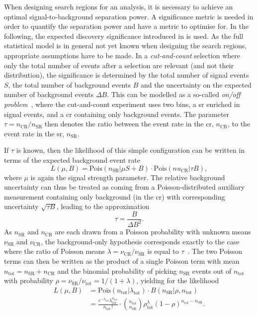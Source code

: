 When designing search regions for an analysis, it is necessary to achieve an optimal signal-to-background separation power. A significance metric is needed in order to quantify the separation power and have a metric to optimise for. In the following, the expected discovery significance introduced in \cite{Cousins:2007bmb} is used. As the full statistical model is in general not yet known when designing the search regions, appropriate assumptions have to be made. In a \textit{cut-and-count} selection where only the total number of events after a selection are relevant (and not \eg their distribution), the significance is determined by the total number of signal events $S$, the total number of background events $B$ and the uncertainty on the expected number of background events $\Delta B$. This can be modelled as a so-called \textit{on/off problem}~\cite{Cousins:2007bmb, CRANMER_2006}, where the cut-and-count experiment uses two bins, a \gls{sr} enriched in signal events, and a \gls{cr} containing only background events. The parameter $\tau = n_\mathrm{CR} / n_\mathrm{SR}$ then denotes the ratio between the event rate in the \gls{cr}, $n_\mathrm{CR}$, to the event rate in the \gls{sr}, $n_\mathrm{SR}$.

If $\tau$ is known, then the likelihood of this simple configuration can be written in terms of the expected background event rate
\begin{equation}
	L (\mu,B) = \mathrm{Pois}(n_{\mathrm{SR}}\vert\mu S + B) \cdot \mathrm{Pois}(nu_{\mathrm{CR}}\vert\tau B),
\end{equation} 
where $\mu$ is again the signal strength parameter. The relative background uncertainty can thus be treated as coming from a Poisson-distributed auxiliary measurement containing only background (\ie in the \gls{cr}) with corresponding uncertainty $\sqrt{\tau B}$, leading to the approximation
\begin{equation}
	\tau = \frac{B}{\Delta B^2}.
\end{equation}
As $n_{\mathrm{SR}}$ and $n_{\mathrm{CR}}$ are each drawn from a Poisson probability with unknown means $\nu_\mathrm{SR}$ and $\nu_\mathrm{CR}$, the background-only hypothesis corresponds exactly to the case where the ratio of Poisson means $\lambda = \nu_\mathrm{CR} / \nu_\mathrm{SR}$ is equal to $\tau$~\cite{Cousins:2007bmb}. The two Poisson terms can then be written as the product of a single Poisson term with mean $n_\mathrm{tot} = n_\mathrm{SR} + n_\mathrm{CR}$ and the binomial probability of picking $n_\mathrm{SR}$ events out of $n_\mathrm{tot}$ with probability $\rho = \nu_\mathrm{SR} / \nu_\mathrm{tot} = 1 / (1+\lambda)$, yielding for the likelihood
\begin{equation}
\begin{split}
	L(\mu, B) & = \mathrm{Pois} (n_\mathrm{tot}\vert\lambda_\mathrm{tot})\cdot B(n_\mathrm{SR}\vert\rho,n_\mathrm{tot}) \\ 
	& = \frac{e^{-\lambda_\mathrm{tot}}\lambda_{\mathrm{tot}}^{n_\mathrm{tot}}}{n_\mathrm{tot}\,!} \cdot{n_\mathrm{tot}\choose n_\mathrm{SR}} \rho^\lambda_\mathrm{tot} (1-\rho)^{n_\mathrm{tot}-n_\mathrm{SR}}.
\end{split}
\end{equation}


